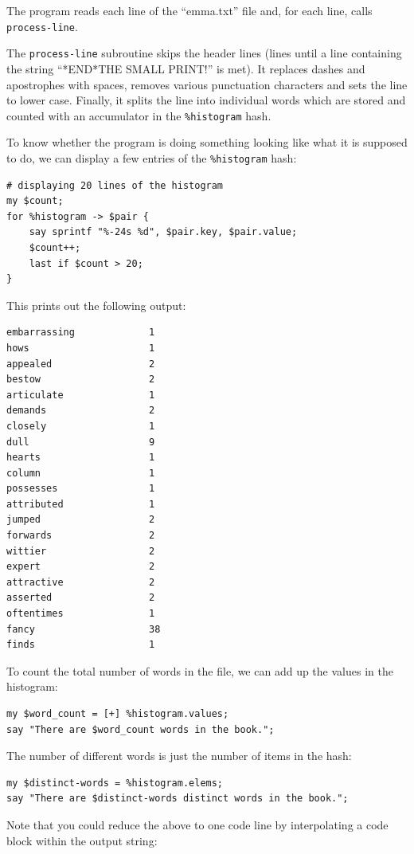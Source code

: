 The program reads each line of the ``emma.txt'' file and, for 
each line, calls \verb"process-line". 

The \verb"process-line" subroutine skips the header lines 
(lines until a line containing the string ``*END*THE SMALL PRINT!'' 
is met). It replaces dashes and apostrophes with spaces, removes 
various punctuation characters and sets the line to lower case. 
Finally, it splits the line into individual words which are 
stored and counted with an accumulator in the \verb'%histogram' 
hash.

To know whether the program is doing something looking like what 
it is supposed to do, we can display a few entries of the 
\verb'%histogram' hash:

\begin{verbatim}
# displaying 20 lines of the histogram
my $count;
for %histogram -> $pair {
    say sprintf "%-24s %d", $pair.key, $pair.value;
    $count++;
    last if $count > 20;
}
\end{verbatim}

This prints out the following output:

\begin{verbatim}
embarrassing             1
hows                     1
appealed                 2
bestow                   2
articulate               1
demands                  2
closely                  1
dull                     9
hearts                   1
column                   1
possesses                1
attributed               1
jumped                   2
forwards                 2
wittier                  2
expert                   2
attractive               2
asserted                 2
oftentimes               1
fancy                    38
finds                    1
\end{verbatim}


To count the total number of words in the file, we can add up
the values in the histogram:

\begin{verbatim}
my $word_count = [+] %histogram.values;
say "There are $word_count words in the book.";
\end{verbatim}
%
The number of different words is just the number of items in
the hash:

\begin{verbatim}
my $distinct-words = %histogram.elems;
say "There are $distinct-words distinct words in the book.";
\end{verbatim}
%
Note that you could reduce the above to one code line by 
interpolating a code block within the output string:


